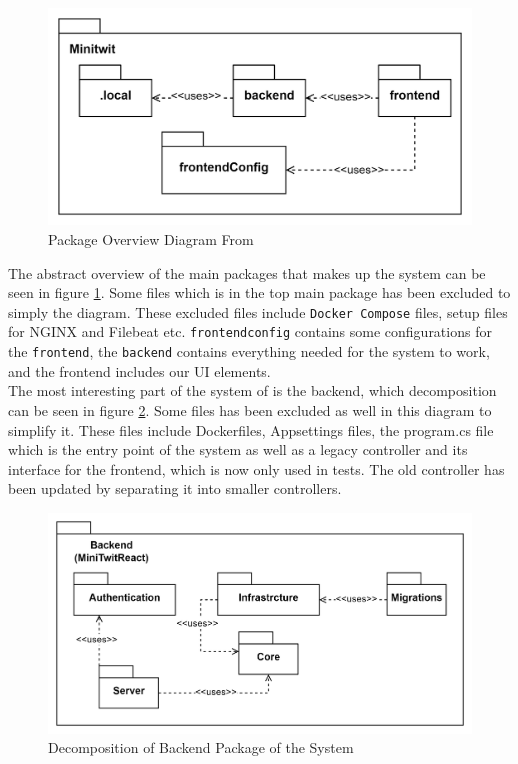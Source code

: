 \begin {figure}[H]
    \centering
    \includegraphics[width=14cm, keepaspectratio]{images/package_class-diagrams/package_diagram.png}
    \caption{Package Overview Diagram From \mini}
    \label{fig:packageOverview}
\end{figure} %
The abstract overview of the main packages that makes up the system can be seen in figure \ref{fig:packageOverview}. 
Some files which is in the top main package has been excluded to simply the diagram. 
These excluded files include \texttt{Docker Compose} files, setup files for NGINX and Filebeat etc.
\texttt{frontendconfig} contains some configurations for the \texttt{frontend}, the \texttt{backend} contains everything needed for the system to work, and the frontend includes our UI elements. \\

The most interesting part of the system of \mini is the backend, which decomposition can be seen in figure \ref{fig:decompositionBackend}. 
Some files has been excluded as well in this diagram to simplify it. 
These files include Dockerfiles, Appsettings files, the program.cs file which is the entry point of the system as well as a legacy controller and its interface for the frontend, which is now only used in tests. 
The old controller has been updated by separating it into smaller controllers.

\begin {figure}[H]
    \centering
    \includegraphics[width=14cm, keepaspectratio]{images/package_class-diagrams/decomposition_backend.png}
    \caption{Decomposition of Backend Package of the \mini System}
    \label{fig:decompositionBackend}
\end{figure}



